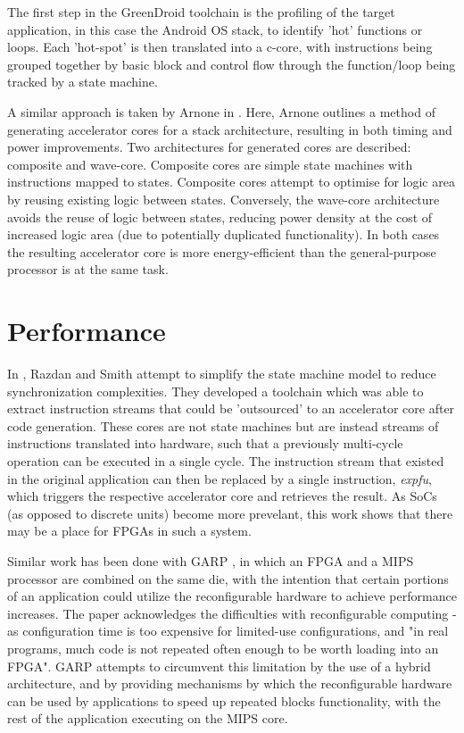 \documentclass{UoYCSproject}
\begin{document}
The first step in the GreenDroid toolchain is the profiling of the target application, in this case the
Android OS stack, to identify 'hot' functions or loops. Each 'hot-spot' is then translated into a c-core,
with instructions being grouped together by basic block and control flow through the function/loop being
tracked by a state machine.

A similar approach is taken by Arnone in \cite{arnone-thesis}. Here, Arnone outlines a method of
generating accelerator cores for a stack architecture, resulting in both timing
and power improvements. Two architectures for generated cores are described: composite and wave-core.
Composite cores are simple state machines with instructions mapped to states. Composite cores attempt to
optimise for logic area by reusing existing logic between states. Conversely, the wave-core
architecture avoids the reuse of logic between states, reducing power density at the cost of increased
logic area (due to potentially duplicated functionality). In both cases the resulting accelerator core is
more energy-efficient than the general-purpose processor is at the same task.

\section{Performance}

In \cite{high-performance-microarchitecture}, Razdan and Smith attempt to simplify the state machine model
to reduce synchronization complexities. They developed a toolchain which was able to extract instruction
streams that could be 'outsourced' to an accelerator core after code generation. These cores are not state
machines but are instead streams of instructions translated into hardware, such that a previously
multi-cycle operation can be executed in a single cycle. The instruction stream that existed in the
original application can then be replaced by a single instruction, \textit{expfu}, which triggers
the respective accelerator core and retrieves the result. As SoCs (as opposed to discrete units) become
more prevelant, this work shows that there may be a place for FPGAs in such a system.

Similar work has been done with GARP \cite{garp}, in which an FPGA and a MIPS processor are combined on the
same die, with the intention that certain portions of an application could utilize the reconfigurable
hardware to achieve performance increases. The paper acknowledges the difficulties with reconfigurable
computing - as configuration time is too expensive for limited-use configurations, and "in real programs,
much code is not repeated often enough to be worth loading into an FPGA". GARP attempts to circumvent this
limitation by the use of a hybrid architecture, and by providing mechanisms by which the reconfigurable
hardware can be used by applications to speed up repeated blocks functionality, with the rest of the
application executing on the MIPS core.

\printbibliography
\end{document}

